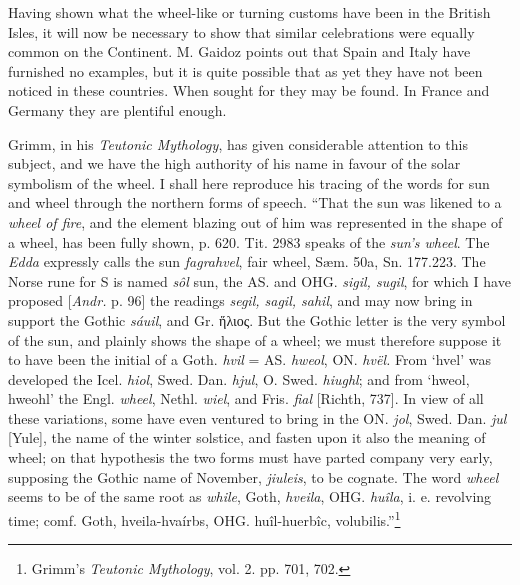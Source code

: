 \documentclass[a4paper, 11pt, oneside, polutonikogreek, english]{article}
\begin{document}
Having shown what the wheel-like or turning customs have been in the British Isles, it will now be necessary to show that similar celebrations were equally common on the Continent. M. Gaidoz points out that Spain and Italy have furnished no examples, but it is quite possible that as yet they have not been noticed in these countries. When sought for they may be found. In France and Germany they are plentiful enough.

Grimm, in his \emph{Teutonic Mythology}, has given considerable attention to this subject, and we have the high authority of his name in favour of the solar symbolism of the wheel. I shall here reproduce his tracing of the words for sun and wheel through the northern forms of speech. ``That the sun was likened to a \emph{wheel of fire}, and the element blazing out of him was represented in the shape of a wheel, has been fully shown, p. 620. Tit. 2983 speaks of the \emph{sun's wheel}. The \emph{Edda} expressly calls the sun \emph{fagrahvel}, fair wheel, Sæm. 50a, Sn. 177.223. The Norse rune for S is named \emph{sôl} sun, the AS. and OHG. \emph{sigil, sugil}, for which I have proposed [\emph{Andr.} p. 96] the readings \emph{segil, sagil, sahil}, and may now bring in support the Gothic \emph{sáuil}, and Gr. ἥλιος. But the Gothic letter \astrosun [= HV] is the very symbol of the sun, and plainly shows the shape of a wheel; we must therefore suppose it to have been the initial of a Goth. \emph{hvil} = AS. \emph{hweol}, ON. \emph{hvël.} From `hvel' was developed the Icel. \emph{hiol}, Swed. Dan. \emph{hjul}, O. Swed. \emph{hiughl}; and from `hweol, hweohl' the Engl. \emph{wheel}, Nethl. \emph{wiel}, and Fris. \emph{fial} [Richth, 737]. In view of all these variations, some have even ventured to bring in the ON. \emph{jol}, Swed. Dan. \emph{jul} [Yule], the name of the winter solstice, and fasten upon it also the meaning of wheel; on that hypothesis the two forms must have parted company very early, supposing the Gothic name of November, \emph{jiuleis}, to be cognate. The word \emph{wheel} seems to be of the same root as \emph{while}, Goth, \emph{hveila}, OHG. \emph{huîla}, i. e. revolving time; comf. Goth, hveila-hvaírbs, OHG. huîl-huerbîc, volubilis.''\footnote{Grimm's \emph{Teutonic Mythology}, vol. 2. pp. 701, 702.}
\end{document}
